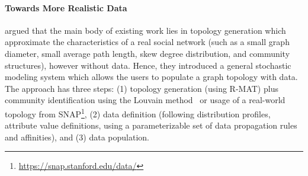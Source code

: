 
\paragraph{Towards More Realistic Data} \cite{Nettleton2016} argued that the main body of existing work lies in
topology generation which approximate the characteristics of a real social
network (such as a small graph diameter, small average path length, skew degree
distribution, and community structures), however without data. Hence, they
introduced a general stochastic modeling system which allows the users to
populate a graph topology with data. The approach has three steps: (1) topology
generation (using R-MAT) plus community identification using the Louvain
method~\cite{1742-5468-2008-10-P10008} or usage of a real-world topology from
SNAP\footnote{\url{https://snap.stanford.edu/data/}}, (2) data definition
(following distribution profiles, attribute value definitions, using a
parameterizable set of data propagation rules and affinities), and (3) data
population.


